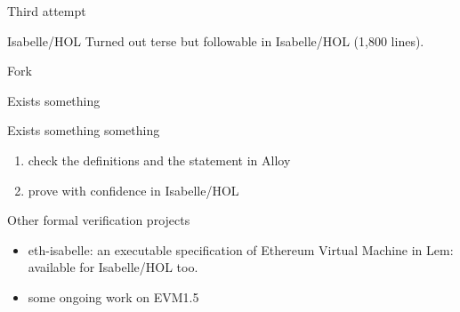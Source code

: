 \documentclass{beamer}
\begin{document}
\begin{frame}{Third attempt}
\end{frame}

\begin{frame}{Isabelle/HOL}
\alert{Turned out terse but followable in Isabelle/HOL (1,800 lines).}

\end{frame}

\begin{frame}{Fork}
\end{frame}

\begin{frame}{Exists something}
\end{frame}

\begin{frame}{Exists something something}
\end{frame}

\begin{frame}
\begin{enumerate}
\item check the definitions and the statement in Alloy
\item prove with confidence in Isabelle/HOL
\end{enumerate}
\end{frame}


\begin{frame}{Other formal verification projects}

\begin{itemize}
\item eth-isabelle: an executable specification of Ethereum Virtual Machine in Lem: available for Isabelle/HOL too.
\item some ongoing work on EVM1.5
\end{itemize}
\end{frame}
\end{document}
